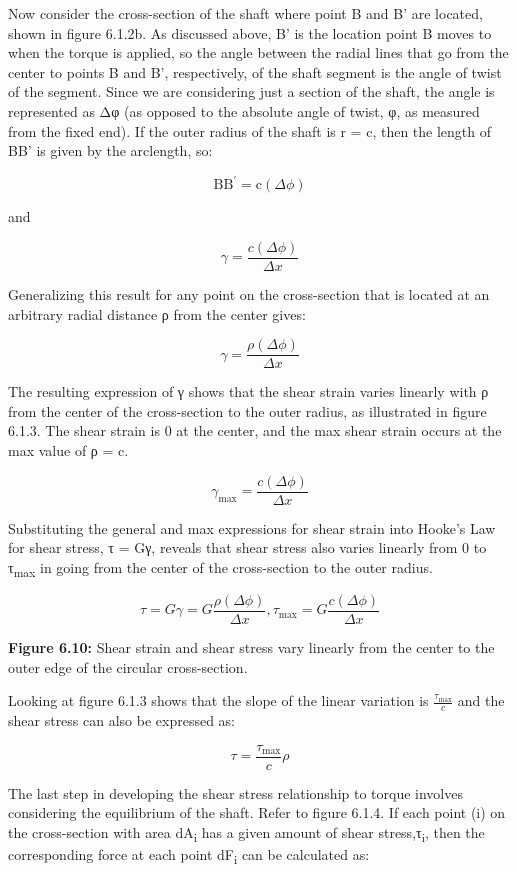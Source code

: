 \documentclass[
  letterpaper,
  DIV=11,
  numbers=noendperiod]{scrreprt}
\theoremstyle{definition}
\theoremstyle{remark}
\begin{document}
Now consider the cross-section of the shaft where point B and B' are
located, shown in figure 6.1.2b. As discussed above, B' is the location
point B moves to when the torque is applied, so the angle between the
radial lines that go from the center to points B and B', respectively,
of the shaft segment is the angle of twist of the segment. Since we are
considering just a section of the shaft, the angle is represented as Δφ
(as opposed to the absolute angle of twist, φ, as measured from the
fixed end). If the outer radius of the shaft is r = c, then the length
of BB' is given by the arclength, so:

\[
\mathrm{BB}^{\prime}=\mathrm{c}(\Delta \phi)
\]

and

\[
\gamma=\frac{c(\Delta \phi)}{\Delta x}
\]

Generalizing this result for any point on the cross-section that is
located at an arbitrary radial distance ρ from the center gives:

\[
\gamma=\frac{\rho(\Delta \phi)}{\Delta x}
\]

The resulting expression of γ shows that the shear strain varies
linearly with ρ from the center of the cross-section to the outer
radius, as illustrated in figure 6.1.3. The shear strain is 0 at the
center, and the max shear strain occurs at the max value of ρ = c.

\[
\gamma_{\max }=\frac{c(\Delta \phi)}{\Delta x}
\]

Substituting the general and max expressions for shear strain into
Hooke's Law for shear stress, τ = Gγ, reveals that shear stress also
varies linearly from 0 to τ\textsubscript{max} in going from the center
of the cross-section to the outer radius.

\[
\tau=G \gamma=G \frac{\rho(\Delta \phi)}{\Delta x}, \tau_{\max }=G \frac{c(\Delta \phi)}{\Delta x}
\]

\textbf{Figure 6.10:} Shear strain and shear stress vary linearly from
the center to the outer edge of the circular cross-section.

Looking at figure 6.1.3 shows that the slope of the linear variation is
\(\frac{\tau_{\max }}{c}\) and the shear stress can also be expressed
as:

\[
\tau=\frac{\tau_{\max }}{c} \rho
\]

The last step in developing the shear stress relationship to torque
involves considering the equilibrium of the shaft. Refer to figure
6.1.4. If each point (i) on the cross-section with area
dA\textsubscript{i} has a given amount of shear
stress,τ\textsubscript{i}, then the corresponding force at each point
dF\textsubscript{i} can be calculated as:
\end{document}
